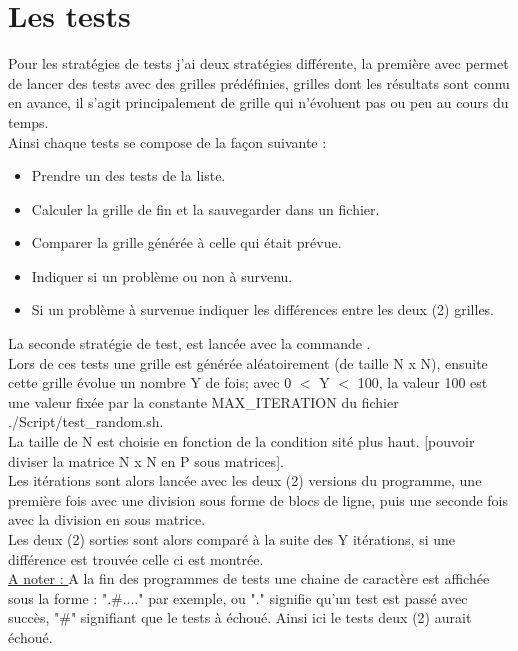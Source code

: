 \documentclass[10pt,a4paper]{article}
\begin{document}
\section{Les tests}
Pour les stratégies de tests j'ai deux stratégies différente, la première avec  permet de lancer des tests avec des grilles prédéfinies, grilles dont les résultats sont connu en avance, il s'agit principalement de grille qui n'évoluent pas ou peu au cours du temps. \\

Ainsi chaque tests se compose de la façon suivante : 
\begin{itemize}
    \item Prendre un des tests de la liste.
    \item Calculer la grille de fin et la sauvegarder dans un fichier.
    \item Comparer la grille générée à celle qui était prévue.
    \item Indiquer si un problème ou non à survenu.
    \item Si un problème à survenue indiquer les différences entre les deux (2) grilles.
\end{itemize}

\hfill \break
La seconde stratégie de test, est lancée avec la commande . \\

Lors de ces tests une grille est générée aléatoirement (de taille N x N), ensuite cette grille évolue un nombre Y de fois; avec 0 $<$ Y $<$ 100, la valeur 100 est une valeur fixée par la constante MAX\_ITERATION du fichier ./Script/test\_random.sh. \\
La taille de N est choisie en fonction de la condition sité plus haut. [pouvoir diviser la matrice N x N en P sous matrices]. \\

Les itérations sont alors lancée avec les deux (2) versions du programme, une première fois avec une division sous forme de blocs de ligne, puis une seconde fois avec la division en sous matrice. \\

Les deux (2) sorties sont alors comparé à la suite des Y itérations, si une différence est trouvée celle ci est montrée.\\

\underline{A noter : } A la fin des programmes de tests une chaine de caractère est affichée sous la forme : ".\#...." par exemple, ou "." signifie qu'un test est passé avec succès, "\#" signifiant que le tests à échoué. Ainsi ici le tests deux (2) aurait échoué.
\end{document}
